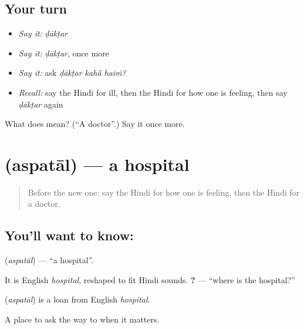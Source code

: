\subsection*{Your turn}
\begin{itemize}
\raggedright
  \item \emph{Say it:} \emph{ḍākṭar}
  \item \emph{Say it:} \emph{ḍākṭar}, once more
  \item \emph{Say it:} ask \emph{ḍākṭar kahā̃ haiṁ?}
  \item \emph{Recall:} say the Hindi for ill, then the Hindi for how one is feeling, then say \emph{ḍākṭar} again
\end{itemize}

\begin{tcolorbox}[breakable,colback=teal!4,colframe=teal!35!black,title={Before you move on}]
What does  mean? (\textquotedblleft{}A doctor\textquotedblright{}.) Say it once more.
\end{tcolorbox}
\section[\texorpdfstring{\hi{अस्पताल} (aspatāl)}{अस्पताल (aspatāl)}]{ (aspatāl) — a hospital}

\label{lesson:HI-C107-aspatal}



\begin{quote}
Before the new one: say the Hindi for how one is feeling, then the Hindi for a doctor.
\end{quote}

\subsection*{You'll want to know: }
\textbf{} (\emph{aspatāl}) — \textquotedblleft{}a hospital\textquotedblright{}.

It is English \emph{hospital}, reshaped to fit Hindi sounds. \textbf{  ?} — \textquotedblleft{}where is the hospital?\textquotedblright{}

\begin{cousinweb}
\textbf{} (\emph{aspatāl}) is a loan from English \emph{hospital}.
\end{cousinweb}

\begin{grammarlens}[title={What you've built}]
A place to ask the way to when it matters.
\end{grammarlens}

